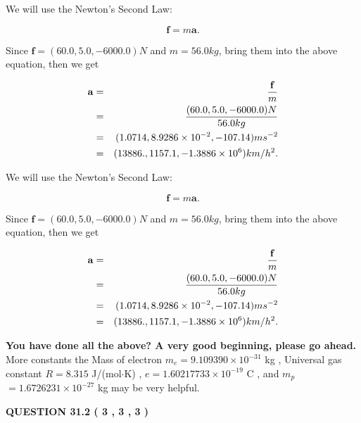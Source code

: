 \documentclass[12pt]{article}
\begin{document}
We will use the Newton's Second Law:
 
\[
\mathbf{f}=m\mathbf{a}.
\]
 
Since $\mathbf{f}=( %
60.0,  %
5.0,  %
-6000.0 )N$
and $m= %
56.0 kg$, bring them into the above equation, then we get
 
\begin{eqnarray*}
\mathbf{a}&=&\frac{\mathbf{f}}m  \\
&=&\frac{(
60.0 ,
5.0 ,
-6000.0 )N
}{ %
56.0 kg}  \\
&=&(
1.0714 ,
8.9286 \times 10^{-2},
-107.14
)ms^{-2} \\
&=&(
13886. ,
1157.1 ,
-1.3886 \times 10^{6}
)km/h^2.
\end{eqnarray*}
 
 
 
 
 
\noindent{}

We will use the Newton's Second Law:
 
\[
\mathbf{f}=m\mathbf{a}.
\]
 
Since $\mathbf{f}=( %
60.0,  %
5.0,  %
-6000.0 )N$
and $m= %
56.0 kg$, bring them into the above equation, then we get
 
\begin{eqnarray*}
\mathbf{a}&=&\frac{\mathbf{f}}m  \\
&=&\frac{(
60.0 ,
5.0 ,
-6000.0 )N
}{ %
56.0 kg}  \\
&=&(
1.0714 ,
8.9286 \times 10^{-2},
-107.14
)ms^{-2} \\
&=&(
13886. ,
1157.1 ,
-1.3886 \times 10^{6}
)km/h^2.
\end{eqnarray*}
 
 
 
   
   
\vspace{0.3in}
{\textbf{\LARGE{You have done all the above? A very good beginning, please go ahead.}}}
More constants the
Mass of electron
$m_e$$ =
9.109390 \times 10^{-31} $
kg
,
Universal gas constant
$R$$ =
8.315 $
J/(mol$\cdot $K)
,
$e$$ =
1.60217733 \times 10^{-19} $
C
, and
$m_p$$ =
1.6726231 \times 10^{-27} $
kg
%
may be very helpful.
\vspace{0.3in}
   
   
  
\vspace{0.2in}
  
{\textbf{\Large{QUESTION
31.2 
 (           3 ,           3 ,           3 )
}}}
  
\end{document}
